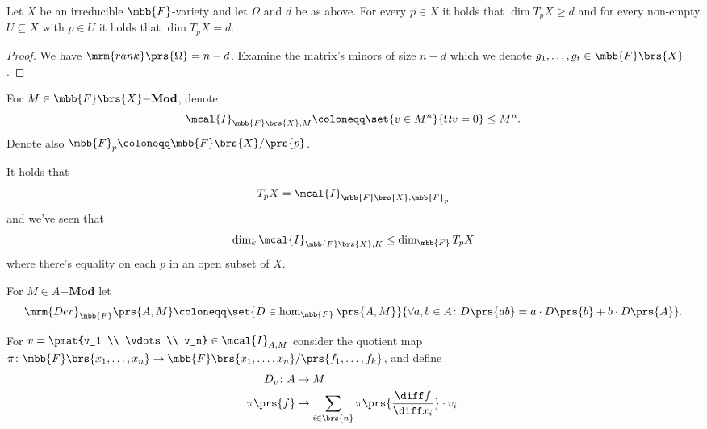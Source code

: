 \documentclass[10pt,a4paper,twoside,openany,hidelinks]{book}
\begin{document}
\begin{proposition}
Let $X$ be an irreducible $\mbb{F}$-variety and let $\Omega$ and $d$ be as above. For every $p \in X$ it holds that $\dim T_p X \geq d$ and for every non-empty $U \subseteq X$ with $p \in U$ it holds that $\dim T_p X = d$.
\end{proposition}

\begin{proof}
We have $\mrm{rank}\prs{\Omega} = n - d$. Examine the matrix's minors of size $n-d$ which we denote $g_1, \ldots, g_t \in \mbb{F}\brs{X}$.
\end{proof}



\begin{notation}
For $M \in \mbb{F}\brs{X}\mathbf{-Mod}$, denote
\begin{align*}
\mcal{I}_{\mbb{F}\brs{X}, M} \coloneqq \set{v \in M^n}{\Omega v = 0} \leq M^n \text{.}
\end{align*}
Denote also $\mbb{F}_p \coloneqq \mbb{F}\brs{X} / \prs{p}$.
\end{notation}

\begin{remark}
It holds that
\[T_p X = \mcal{I}_{\mbb{F}\brs{X}, \mbb{F}_p}\]
and we've seen that
\[\dim_k \mcal{I}_{\mbb{F}\brs{X}, K} \leq \dim_{\mbb{F}} T_p X\]
where there's equality on each $p$ in an open subset of $X$.
\end{remark}

\begin{definition}
For $M \in A\mathbf{-Mod}$ let
\begin{align*}
\mrm{Der}_{\mbb{F}}\prs{A,M} \coloneqq \set{D \in \hom_{\mbb{F}}\prs{A,M}}{
\forall a,b \in A \colon D\prs{ab} = a \cdot D\prs{b} + b \cdot D\prs{A}
} \text{.}
\end{align*}
\end{definition}

\begin{definition}
For $v = \pmat{v_1 \\ \vdots \\ v_n} \in \mcal{I}_{A,M}$ consider the quotient map $\pi \colon \mbb{F}\brs{x_1, \ldots, x_n} \to \mbb{F}\brs{x_1, \ldots, x_n}/\prs{f_1, \ldots, f_k}$, and define
\begin{align*}
D_v \colon A &\to M \\
\pi\prs{f} &\mapsto \sum_{i \in \brs{n}}\pi\prs{\frac{\diff f}{\diff x_i}} \cdot v_i \text{.}
\end{align*}
\end{definition}
\end{document}
